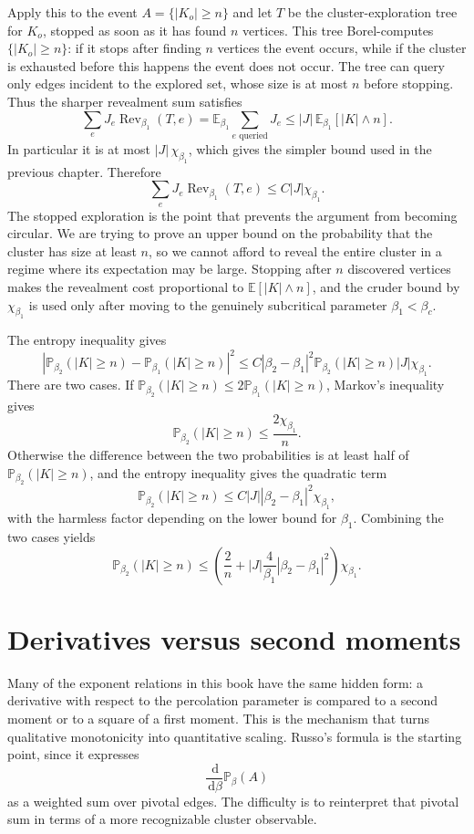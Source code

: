 \documentclass[11pt,reqno]{book}
\numberwithin{equation}{chapter}
\theoremstyle{plain}
\theoremstyle{definition}
\theoremstyle{remark}
\renewcommand{\P}{\mathbb P}
\newcommand{\E}{\mathbb E}
\newcommand{\1}{\mathbf 1}
\newcommand{\dd}{\,\mathrm d}
\begin{document}
Apply this to the event $A=\{|K_o|\geq n\}$ and let $T$ be the cluster-exploration tree for $K_o$, stopped as soon as it has found $n$ vertices. This tree Borel-computes $\{|K_o|\geq n\}$: if it stops after finding $n$ vertices the event occurs, while if the cluster is exhausted before this happens the event does not occur. The tree can query only edges incident to the explored set, whose size is at most $n$ before stopping. Thus the sharper revealment sum satisfies
\[
  \sum_e J_e\operatorname{Rev}_{\beta_1}(T,e)
  =
  \mathbb E_{\beta_1}
  \sum_{e\text{ queried}}J_e
  \leq
  |J|\,\E_{\beta_1}[|K|\wedge n].
\]
In particular it is at most $|J|\,\chi_{\beta_1}$, which gives the simpler bound used in the previous chapter. Therefore
\[
  \sum_eJ_e\operatorname{Rev}_{\beta_1}(T,e)
  \leq
  C|J|\chi_{\beta_1}.
\]
The stopped exploration is the point that prevents the argument from becoming circular. We are trying to prove an upper bound on the probability that the cluster has size at least \(n\), so we cannot afford to reveal the entire cluster in a regime where its expectation may be large. Stopping after \(n\) discovered vertices makes the revealment cost proportional to \(\E[|K|\wedge n]\), and the cruder bound by \(\chi_{\beta_1}\) is used only after moving to the genuinely subcritical parameter \(\beta_1<\beta_c\).

The entropy inequality gives
\[
  |\P_{\beta_2}(|K|\geq n)-\P_{\beta_1}(|K|\geq n)|^2
  \leq
  C|\beta_2-\beta_1|^2
  \P_{\beta_2}(|K|\geq n)
  |J|\chi_{\beta_1}.
\]
There are two cases. If $\P_{\beta_2}(|K|\geq n)\leq 2\P_{\beta_1}(|K|\geq n)$, Markov's inequality gives
\[
  \P_{\beta_2}(|K|\geq n)\leq \frac{2\chi_{\beta_1}}{n}.
\]
Otherwise the difference between the two probabilities is at least half of $\P_{\beta_2}(|K|\geq n)$, and the entropy inequality gives the quadratic term
\[
  \P_{\beta_2}(|K|\geq n)
  \leq
  C|J||\beta_2-\beta_1|^2\chi_{\beta_1},
\]
with the harmless factor depending on the lower bound for \(\beta_1\). Combining the two cases yields
\[
  \P_{\beta_2}(|K|\geq n)
  \leq
  \left(
  \frac2n+
  |J|\frac4{\beta_1}|\beta_2-\beta_1|^2
  \right)\chi_{\beta_1}.
\]

\section{Derivatives versus second moments}

Many of the exponent relations in this book have the same hidden form: a derivative with respect to the percolation parameter is compared to a second moment or to a square of a first moment. This is the mechanism that turns qualitative monotonicity into quantitative scaling. Russo's formula is the starting point, since it expresses
\[
  \frac{\dd}{\dd\beta}\P_\beta(A)
\]
as a weighted sum over pivotal edges. The difficulty is to reinterpret that pivotal sum in terms of a more recognizable cluster observable.
\end{document}
